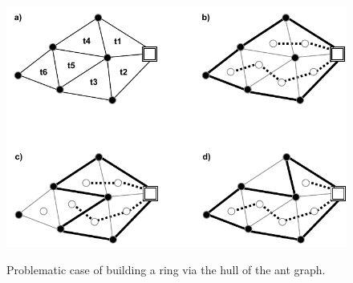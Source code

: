 \begin{figure}[h]
	\begin{centering}
		{\includegraphics[scale=0.9]{figures/approach/backandforth.pdf}}
		\caption[Problematic case of building a ring]{Problematic case of building a ring via the hull of the ant graph.}
		\label{fig:backandforth}
	\end{centering}
\end{figure}
